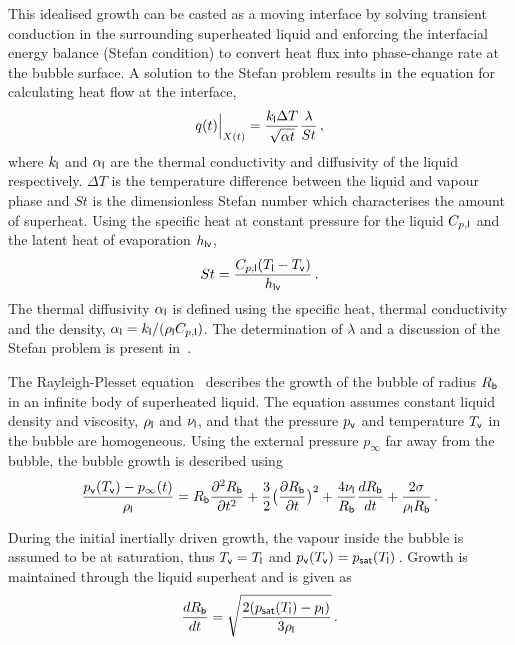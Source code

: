 This idealised growth can be casted as a moving interface by solving transient conduction in the surrounding superheated liquid and enforcing 
 the interfacial energy balance (Stefan condition) to convert heat flux into phase-change rate at the bubble surface.
 A solution to the Stefan problem results in the equation for calculating heat flow at the interface,
 \begin{equation}\label{eq:interface_heat}
  q(t)\Big|_{X(t)} = \frac{k_{\mathsf {l}} \Delta T}{\sqrt{\alpha t}} \frac{\lambda}{St}\,,
 \end{equation}
 where $k_{\mathsf {l}}$ and $\alpha_{\mathsf {l}}$ are the thermal conductivity and diffusivity of the liquid respectively.
 $\Delta T$ is the temperature difference between the liquid and vapour phase and $St$ is the dimensionless Stefan number
 which characterises the amount of superheat. Using the specific heat at constant pressure
 for the liquid $C_{p,\mathsf {l}}$ and the latent heat of evaporation $h_{\mathsf {lv}}$,
 \begin{equation}
  St = \frac{C_{p,\mathsf {l}} (T_{\mathsf {l}} - T_{\mathsf {v}})}{h_{\mathsf {lv}}}\,.
 \end{equation}
The thermal diffusivity $\alpha_{\mathsf {l}}$ is defined using the specific heat, thermal conductivity 
 and the density, \(\alpha_{\mathsf {l}} = k_{\mathsf {l}}/(\rho_{\mathsf {l}} C_{p,\mathsf {l}})\).
 The determination of $\lambda$ and a discussion of 
 the Stefan problem is present in~. 
~\cite{pinhasiModelingFlashingTwoPhase2005,Gartner2024-zh,sherFlashboilingAtomization2008}

The Rayleigh-Plesset equation~ describes the growth of the bubble of radius $R_{\mathsf {b}}$ in an infinite body of superheated liquid.
 The equation assumes constant liquid density and viscosity, $\rho_{\mathsf {l}}$ and $\nu_{\mathsf {l}}$, and that the pressure $p_{\mathsf {v}}$ and temperature
 $T_{\mathsf {v}}$ in the bubble are homogeneous. Using the external pressure $p_{\infty}$ far away from the bubble, the 
 bubble growth is described using
 \begin{equation}\label{eq:rayleigh-plesset}
  \frac{p_{\mathsf {v}}(T_{\mathsf {v}}) - p_{\infty}(t)}{\rho_{\mathsf {l}}} = R_{\mathsf {b}} \displaystyle\frac{\partial^{2}{R_{\mathsf {b}}}}{\partial{t}^{2}}
  + \frac{3}{2}\bigl(\displaystyle\frac{\partial{R_{\ensuremath{\mathsf {b}}}}}{\partial{t}}\bigr)^{2} + \frac{4\nu_{\mathsf {l}}}{R_{\mathsf {b}}} \displaystyle\frac{d{R_{\mathsf {b}}}}{d{t}}
+ \frac{2\sigma}{\rho_{\mathsf {l}} R_{\mathsf {b}}}\,.
\end{equation}

During the initial inertially driven growth, the vapour inside the bubble is assumed to be at saturation,
thus $T_{\mathsf {v}} = T_{\mathsf {l}}$ and $p_{\mathsf {v}}(T_{\mathsf {v}}) = p_{\mathsf {sat}}(T_{\mathsf {l}})\,$. Growth is 
maintained through the liquid superheat and is given as
\begin{equation}\label{eq:inertial-lim}
  \displaystyle\frac{d{R_{\mathsf {b}}}}{d{t}}  = \sqrt{\frac{2 (p_{\mathsf {sat}}(T_{\mathsf {l}}) - p_{\mathsf {l}})}{3\rho_{\mathsf {l}}}}\,.
\end{equation}


